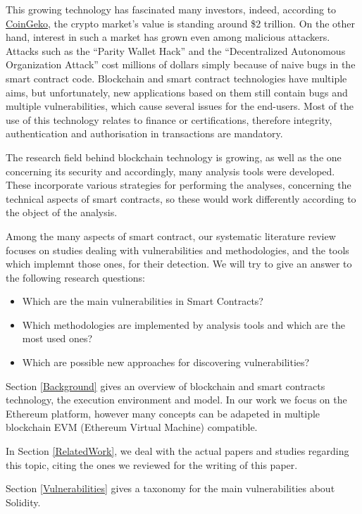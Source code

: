 \documentclass[a4paper,sigconf, language=french,
language=german, language=spanish, language=english]{acmart}
\begin{document}
This growing technology has fascinated many investors, indeed, according to \href{https://www.coingecko.com/}{CoinGeko}, 
the crypto market's value is standing around \$2 trillion. 
On the other hand, interest in such a market has grown even among malicious attackers. 
Attacks such as the “Parity Wallet Hack” and the “Decentralized Autonomous Organization Attack” cost millions of dollars simply because of 
naive bugs in the smart contract code. Blockchain and smart contract technologies have multiple aims, but unfortunately, new applications 
based on them still contain bugs and multiple vulnerabilities, which cause 
several issues for the end-users. Most of the use of this technology relates to finance or certifications, therefore integrity, 
authentication and authorisation in transactions are mandatory. 

The research field behind blockchain technology is growing, as well as the one concerning 
its security and accordingly, many analysis tools were developed. 
These incorporate various strategies for performing the analyses, concerning the technical aspects of smart contracts, 
so these would work differently according to the object of the analysis. 

Among the many aspects of smart contract, our systematic
literature review focuses on studies dealing with vulnerabilities and methodologies, and the tools which implemnt those ones, for their detection. We will try to give an answer to the following 
research questions:
\begin{itemize}
    \item Which are the main vulnerabilities in Smart Contracts?
    \item Which methodologies are implemented by analysis tools and which are the most used ones?
    \item Which are possible new approaches for discovering vulnerabilities?
\end{itemize}
Section \ref{Background} gives an overview of blockchain and smart contracts technology, the execution environment and model. 
In our work we focus on the Ethereum platform, however many concepts can be adapeted in multiple blockchain EVM (Ethereum Virtual Machine) compatible.

In Section \ref{RelatedWork}, we deal with the actual papers and studies regarding this topic, citing the ones we reviewed for the writing of this paper.

Section \ref{Vulnerabilities} gives a taxonomy for the main vulnerabilities about Solidity. 
\end{document}
